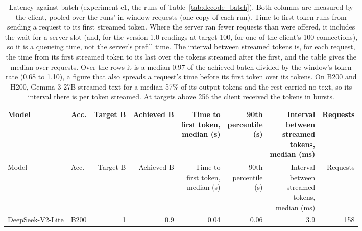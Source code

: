 \begingroup
\footnotesize
\setlength{\tabcolsep}{4pt}
\begin{longtable}{llrrrrrr}
\caption{Latency against batch (experiment c1, the runs of Table~\ref{tab:decode_batch}). Both columns are measured by the client, pooled over the runs' in-window requests (one copy of each run). Time to first token runs from sending a request to its first streamed token. Where the server ran fewer requests than were offered, it includes the wait for a server slot (and, for the version 1.0 readings at target 100, for one of the client's 100 connections), so it is a queueing time, not the server's prefill time. The interval between streamed tokens is, for each request, the time from its first streamed token to its last over the tokens streamed after the first, and the table gives the median over requests. Over the rows it is a median 0.97 of the achieved batch divided by the window's token rate (0.68 to 1.10), a figure that also spreads a request's time before its first token over its tokens. On B200 and H200, Gemma-3-27B streamed text for a median 57\% of its output tokens and the rest carried no text, so its interval there is per token streamed. At targets above 256 the client received the tokens in bursts.}\label{tab:latency}\\
\toprule
Model & Acc. & Target B & Achieved B & \makecell[r]{Time to\\first token,\\median (s)} & \makecell[r]{90th\\percentile\\(s)} & \makecell[r]{Interval\\between\\streamed\\tokens,\\median (ms)} & Requests \\
\midrule
\endfirsthead
\toprule
Model & Acc. & Target B & Achieved B & \makecell[r]{Time to\\first token,\\median (s)} & \makecell[r]{90th\\percentile\\(s)} & \makecell[r]{Interval\\between\\streamed\\tokens,\\median (ms)} & Requests \\
\midrule
\endhead
\bottomrule
\endfoot
DeepSeek-V2-Lite & B200 & 1 & 0.9 & 0.04 & 0.06 & 3.9 & 158 \\

\end{longtable}
